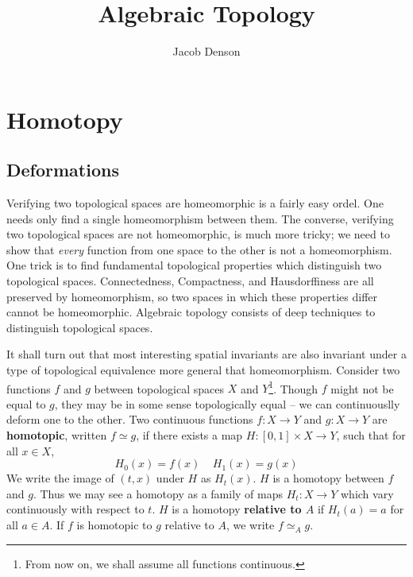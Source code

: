 

\DeclareMathOperator{\Dom}{Dom}

\title{Algebraic Topology}
\author{Jacob Denson}




\maketitle

\tableofcontents


\chapter{Homotopy}

\section{Deformations}

Verifying two topological spaces are homeomorphic is a fairly easy ordel. One needs only find a single homeomorphism between them. The converse, verifying two topological spaces are not homeomorphic, is much more tricky; we need to show that {\it every} function from one space to the other is not a homeomorphism. One trick is to find fundamental topological properties which distinguish two topological spaces. Connectedness, Compactness, and Hausdorffiness are all preserved by homeomorphism, so two spaces in which these properties differ cannot be homeomorphic. Algebraic topology consists of deep techniques to distinguish topological spaces.

It shall turn out that most interesting spatial invariants are also invariant under a type of topological equivalence more general that homeomorphism. Consider two functions $f$ and $g$ between topological spaces $X$ and $Y$\footnote{From now on, we shall assume all functions continuous.}. Though $f$ might not be equal to $g$, they may be in some sense topologically equal -- we can continuouslly deform one to the other. Two continuous functions $f: X \to Y$ and $g:X \to Y$ are {\bf homotopic}, written $f \simeq g$, if there exists a map $H: [0,1] \times X \to Y$, such that for all $x \in X$,
%
\[ H_0(x) = f(x)\ \ \ \ \ H_1(x) = g(x) \]
%
We write the image of $(t,x)$ under $H$ as $H_t(x)$. $H$ is a homotopy between $f$ and $g$. Thus we may see a homotopy as a family of maps $H_t: X \to Y$ which vary continuously with respect to $t$. $H$ is a homotopy {\bf relative to $A$} if $H_t(a) = a$ for all $a \in A$. If $f$ is homotopic to $g$ relative to $A$, we write $f \simeq_A g$.

